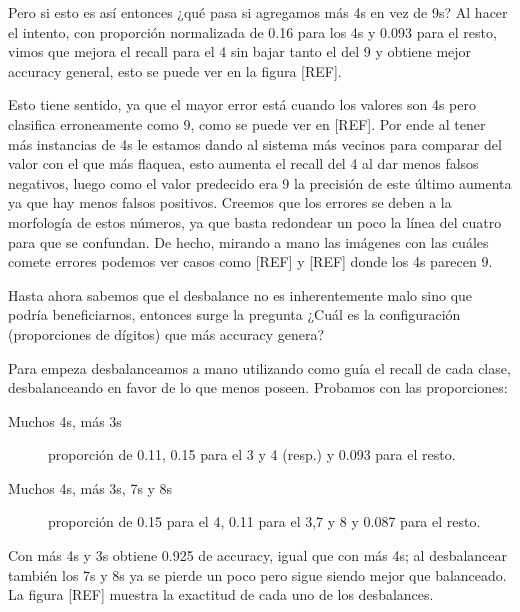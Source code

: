 Pero si esto es así entonces ¿qué pasa si agregamos más 4s en vez de 9s? Al hacer el intento, con proporción normalizada de 0.16 para los 4s y 0.093 para el resto, vimos que mejora el recall para el 4 sin bajar tanto el del 9 y obtiene mejor accuracy general, esto se puede ver en la figura [REF].

Esto tiene sentido, ya que el mayor error está cuando los valores son 4s pero clasifica erroneamente como 9, como se puede ver en [REF]. %
Por ende al tener más instancias de 4s le estamos dando al sistema más vecinos para comparar del valor con el que más flaquea, esto aumenta el recall del 4 al dar menos falsos negativos, %
luego como el valor predecido era 9 la precisión de este último aumenta ya que hay menos falsos positivos.
Creemos que los errores se deben a la morfología de estos números, ya que basta redondear un poco la línea del cuatro para que se confundan. De hecho, mirando a mano las imágenes con las cuáles comete errores podemos ver casos como [REF] y [REF] donde los 4s parecen 9.%

Hasta ahora sabemos que el desbalance no es inherentemente malo sino que podría beneficiarnos, entonces surge la pregunta ¿Cuál es la configuración (proporciones de dígitos) que más accuracy genera?

Para empeza desbalanceamos a mano utilizando como guía el recall de cada clase, desbalanceando en favor de lo que menos poseen. Probamos con las proporciones: 

\begin{description}
 \item [Muchos 4s, más 3s] proporción de 0.11, 0.15 para el 3 y 4 (resp.) y 0.093 para el resto. 
 \item [Muchos 4s, más 3s, 7s y 8s] proporción de 0.15 para el 4, 0.11 para el 3,7 y 8 y 0.087 para el resto. 
\end{description}

Con más 4s y 3s obtiene 0.925 de accuracy, igual que con más 4s; al desbalancear también los 7s y 8s ya se pierde un poco pero sigue siendo mejor que balanceado. La figura [REF] %
muestra la exactitud de cada uno de los desbalances.




